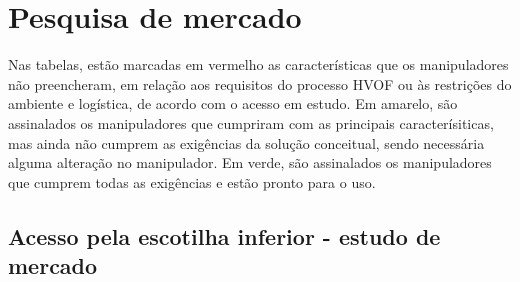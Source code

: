 \appendix \section{Pesquisa de mercado}
Nas tabelas, estão marcadas em vermelho as características que os manipuladores
não preencheram, em relação aos requisitos do processo HVOF ou às restrições do
ambiente e logística, de acordo com o acesso em estudo. Em amarelo, são
assinalados os manipuladores que cumpriram com as principais caracterísiticas,
mas ainda não cumprem as exigências da solução conceitual, sendo necessária
alguma alteração no manipulador. Em verde, são assinalados os manipuladores que
cumprem todas as exigências e estão pronto para o uso.
 
\subsection{Acesso pela escotilha inferior - estudo de
mercado}\label{ape::bighatch}
